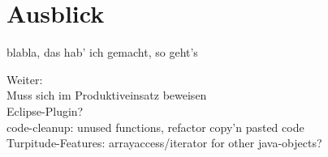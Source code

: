 \chapter{Ausblick}
\label{sec:extro}
blabla, das hab' ich gemacht, so geht's

Weiter: \\
Muss sich im Produktiveinsatz beweisen\\
Eclipse-Plugin?\\
code-cleanup: unused functions, refactor copy'n pasted code\\
Turpitude-Features: arrayaccess/iterator for other java-objects?\\


